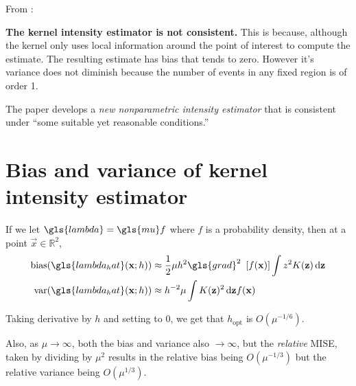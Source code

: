 From \citet{guan2008consistent}:

{
\color{red}
\textbf{The kernel intensity estimator is not consistent.}
This is because, although the kernel only uses local information around the point of interest to compute the estimate.
The resulting estimate has bias that tends to zero.
However it's variance does not diminish because the number of events in any fixed region is of order 1.
}

The paper develops a \textit{new nonparametric intensity estimator} that is consistent under ``some suitable yet reasonable conditions.''

%
%
\section{Bias and variance of kernel intensity estimator}

If we let \(\gls{lambda} = \gls{mu} f\) where \(f\) is a probability density, then at a point \(\vec{x} \in \mathbb{R}^2\),
\begin{align}
\mbox{bias}(\gls{lambda_hat}(\vec{x};h)) & \approx \frac{1}{2} \mu h^2 \gls{grad}^2~\left[ f(\vec{x}) \right] \int {z^2 K(\vec{z}) \diff \vec{z}} \\
\mbox{var}(\gls{lambda_hat}(\vec{x};h)) & \approx h^{-2} \mu \int {K(\vec{z})^2\diff \vec{z}} f(\vec{x})
\end{align}

Taking derivative by \(h\) and setting to \(0\), we get that \(h_{\mbox{opt}}\) is \(O(\mu^{-1/6})\).

Also, as \(\mu \to \infty\), both the bias and variance also \(\to \infty\),
but the \textit{relative} MISE, taken by dividing by \(\mu^2\) results in the relative bias being \(O(\mu^{-1/3})\)
but the relative variance being \(O(\mu^{1/3})\).



